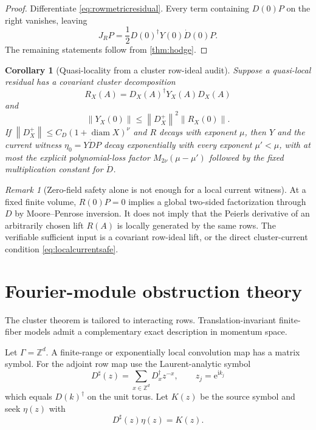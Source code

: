 \documentclass[11pt]{article}
\newtheorem{corollary}[theorem]{Corollary}
\theoremstyle{definition}
\theoremstyle{remark}
\newtheorem{remark}[theorem]{Remark}
\newcommand{\I}{\mathrm i}
\newcommand{\e}{\mathrm e}
\newcommand{\norm}[1]{\left\lVert #1\right\rVert}
\newcommand{\diam}{\operatorname{diam}}
\begin{document}
\begin{proof}
Differentiate \eqref{eq:rowmetricresidual}.  Every term containing $D(0)P$ on the right vanishes, leaving
\[
 J_RP=\frac12D(0)^\dagger Y(0)\dot D(0)P.
\]
The remaining statements follow from \cref{thm:hodge}.
\end{proof}

\begin{corollary}[Quasi-locality from a cluster row-ideal audit]
Suppose a quasi-local residual has a covariant cluster decomposition
\[
 R_X(A)=D_X(A)^\dagger Y_X(A)D_X(A)
\]
and
\begin{equation}
 \norm{Y_X(0)}\le\norm{D_X^+}^2\norm{R_X(0)}.
 \label{eq:Ycluster}
\end{equation}
If $\norm{D_X^+}\le C_D(1+\diam X)^\nu$ and $R$ decays with exponent $\mu$, then $Y$ and the current witness $\eta_0=Y\dot DP$ decay exponentially with every exponent $\mu'<\mu$, with at most the explicit polynomial-loss factor $M_{2\nu}(\mu-\mu')$ followed by the fixed multiplication constant for $\dot D$.
\end{corollary}

\begin{remark}[Zero-field safety alone is not enough for a local current witness]
At a fixed finite volume, $R(0)P=0$ implies a global two-sided factorization through $D$ by Moore--Penrose inversion.  It does not imply that the Peierls derivative of an arbitrarily chosen lift $R(A)$ is locally generated by the same rows.  The verifiable sufficient input is a covariant row-ideal lift, or the direct cluster-current condition \eqref{eq:localcurrentsafe}.
\end{remark}

\section{Fourier-module obstruction theory}

The cluster theorem is tailored to interacting rows.  Translation-invariant finite-fiber models admit a complementary exact description in momentum space.

Let $\Gamma=\mathbb Z^d$.  A finite-range or exponentially local convolution map has a matrix symbol.  For the adjoint row map use the Laurent-analytic symbol
\begin{equation}
 D^\sharp(z)=\sum_{x\in\mathbb Z^d}D_x^\dagger z^{-x},
 \qquad z_j=\e^{\I k_j}
 \label{eq:Dsharp}
\end{equation}
which equals $D(k)^\dagger$ on the unit torus.  Let $K(z)$ be the source symbol and seek $\eta(z)$ with
\begin{equation}
 D^\sharp(z)\eta(z)=K(z).
 \label{eq:symboleq}
\end{equation}
\end{document}
